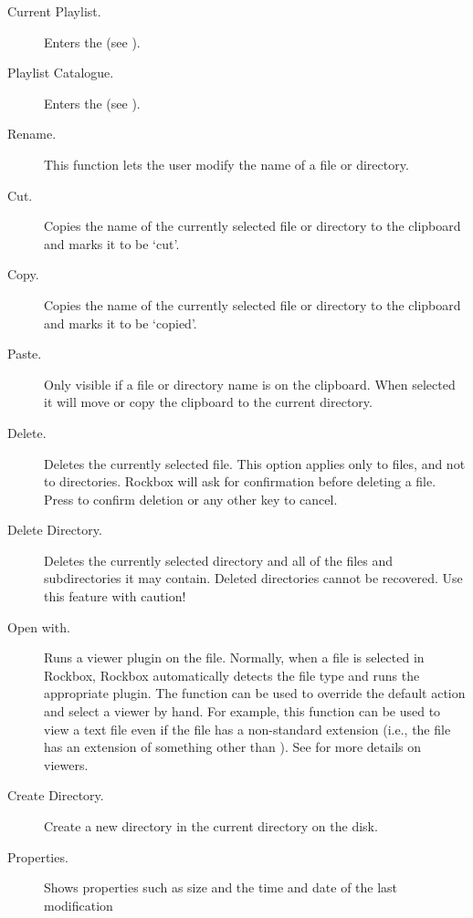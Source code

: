 \begin{description}
\item [Current Playlist.]
  Enters the  (see ).
\item [Playlist Catalogue.]
  Enters the  (see 
  ).
\item [Rename.]
  This function lets the user modify the name of a file or directory.
\item [Cut.]
  Copies the name of the currently selected file or directory to the clipboard
  and marks it to be `cut'.
\item [Copy.]
  Copies the name of the currently selected file or directory to the clipboard
  and marks it to be `copied'.
\item [Paste.]
  Only visible if a file or directory name is on the clipboard. When selected
  it will move or copy the clipboard to the current directory.
\item [Delete.]
  Deletes the currently selected file. This option applies only to files, and
  not to directories. Rockbox will ask for confirmation before deleting a file.
  Press \ActionYesNoAccept{}
  to confirm deletion or any other key to cancel.
\item [Delete Directory.]
  Deletes the currently selected directory and all of the files and subdirectories
  it may contain. Deleted directories cannot be recovered. Use this feature with
  caution!
\item [Open with.]
  Runs a viewer plugin on the file. Normally, when a file is selected in Rockbox,
  Rockbox automatically detects the file type and runs the appropriate plugin.
  The  function can be used to override the default action and
  select a viewer by hand.
  For example, this function can be used to view a text file
  even if the file has a non-standard extension (i.e., the file has an extension
  of something other than ). See 
  for more details on viewers.
\item [Create Directory.]
  Create a new directory in the current directory on the disk.
\item [Properties.]
  Shows properties such as size and the time and date of the last modification

\end{description}
